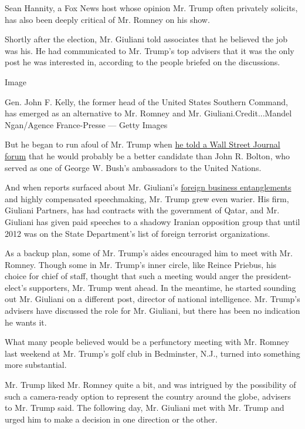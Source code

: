 Sean Hannity, a Fox News host whose opinion Mr. Trump often privately
solicits, has also been deeply critical of Mr. Romney on his show.

Shortly after the election, Mr. Giuliani told associates that he
believed the job was his. He had communicated to Mr. Trump's top
advisers that it was the only post he was interested in, according to
the people briefed on the discussions.

Image

Gen. John F. Kelly, the former head of the United States Southern
Command, has emerged as an alternative to Mr. Romney and Mr.
Giuliani.Credit...Mandel Ngan/Agence France-Presse --- Getty Images

But he began to run afoul of Mr. Trump when
\href{http://www.wsj.com/articles/rudy-giuliani-john-bolton-are-leading-candidates-for-next-secretary-of-state-1479156004}{he
told a Wall Street Journal forum} that he would probably be a better
candidate than John R. Bolton, who served as one of George W. Bush's
ambassadors to the United Nations.

And when reports surfaced about Mr. Giuliani's
\href{http://www.nytimes.com/2016/11/16/us/politics/donald-trump-cabinet-rudy-giuliani.html?_r=0}{foreign
business entanglements} and highly compensated speechmaking, Mr. Trump
grew even warier. His firm, Giuliani Partners, has had contracts with
the government of Qatar, and Mr. Giuliani has given paid speeches to a
shadowy Iranian opposition group that until 2012 was on the State
Department's list of foreign terrorist organizations.

As a backup plan, some of Mr. Trump's aides encouraged him to meet with
Mr. Romney. Though some in Mr. Trump's inner circle, like Reince
Priebus, his choice for chief of staff, thought that such a meeting
would anger the president-elect's supporters, Mr. Trump went ahead. In
the meantime, he started sounding out Mr. Giuliani on a different post,
director of national intelligence. Mr. Trump's advisers have discussed
the role for Mr. Giuliani, but there has been no indication he wants it.

What many people believed would be a perfunctory meeting with Mr. Romney
last weekend at Mr. Trump's golf club in Bedminster, N.J., turned into
something more substantial.

Mr. Trump liked Mr. Romney quite a bit, and was intrigued by the
possibility of such a camera-ready option to represent the country
around the globe, advisers to Mr. Trump said. The following day, Mr.
Giuliani met with Mr. Trump and urged him to make a decision in one
direction or the other.

